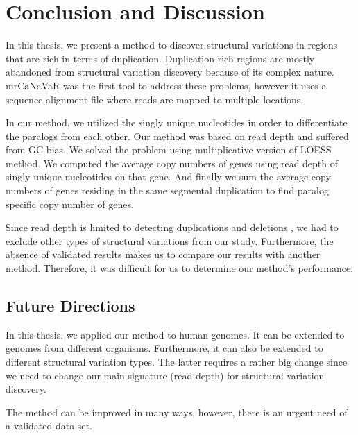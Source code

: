 \chapter{Conclusion and Discussion}
In this thesis, we present a method to discover structural variations in regions that are rich in terms of duplication. Duplication-rich regions are mostly abandoned from 
structural variation discovery because of its complex nature. mrCaNaVaR was the first tool to address these problems, however it uses a sequence alignment file where reads are mapped to multiple locations. 

In our method, we utilized the singly unique nucleotides in order to differentiate the paralogs from each other. Our method was based on read depth and suffered from GC bias. We solved the problem using multiplicative version of LOESS method. We computed the average copy numbers of genes using read depth of singly unique nucleotides on that gene. And finally we sum the average copy numbers of genes residing in the same segmental duplication to find paralog specific copy number of genes.

Since read depth is limited to detecting duplications and deletions \cite{alkan2011genome}, we had to exclude other types of structural variations from our study. Furthermore, the absence of validated results makes us to compare our results with another method. Therefore, it was difficult for us to determine our method's performance. 

\section{Future Directions}

In this thesis, we applied our method to human genomes. It can be extended to genomes from different organisms. Furthermore, it can also be extended to different structural variation types. The latter requires a rather big change since we need to change our main signature (read depth) for structural variation discovery.

The method can be improved in many ways, however, there is an urgent need of a validated data set.